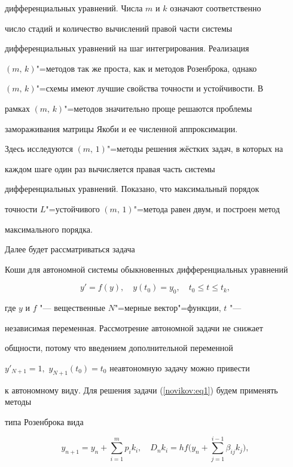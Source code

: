 дифференциальных уравнений. Числа $m$  и $k$ означают соответственно

число стадий и количество вычислений правой части системы

дифференциальных уравнений на шаг интегрирования. Реализация

$(m,\,k)$"=методов так же проста, как и методов Розенброка, однако

$(m,\,k)$"=схемы имеют лучшие свойства точности и устойчивости. В

рамках $(m,\,k)$"=методов значительно проще решаются проблемы

замораживания матрицы Якоби и ее численной аппроксимации.



Здесь исследуются $(m,\,1)$"=методы решения жёстких задач, в которых на

каждом шаге один раз вычисляется правая часть системы

дифференциальных уравнений. Показано, что максимальный порядок

точности $L$"=устойчивого $(m,\,1)$"=метода равен двум, и построен метод

максимального порядка.



\smallskip



 Далее будет рассматриваться задача

Коши для автономной системы обыкновенных дифференциальных уравнений

\begin{equation}

\label{novikov:eq1}

y'=f(y),\quad y(t_0)=y_0,\quad t_0 \leq t \leq t_k,

\end{equation}

где $y$ и $f$ "--- вещественные $N$"=мерные вектор"=функции, $t$ "---

независимая переменная. Рассмотрение автономной задачи не снижает

общности, потому что введением дополнительной переменной

$y'_{N+1}=1,$ $y_{N+1}(t_0)=t_0$ неавтономную задачу можно привести

к автономному виду. Для решения задачи (\ref{novikov:eq1}) будем  применять методы

типа Розенброка вида

\begin{equation}

\label{novikov:eq2}

y_{n+1}=y_n + \sum\limits_{i=1}^m p_i k_i,\quad

 D_nk_i=hf \biggl(y_n + \sum\limits_{j=1}^{i-1}\beta_{ij}k_j \biggr),

\end{equation}

